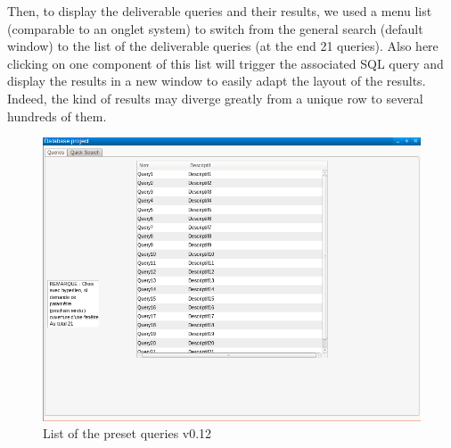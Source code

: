 \documentclass{article}
\begin{document}
Then, to display the deliverable queries and their results, we used a menu list (comparable to an onglet system) to switch from the general search (default window) to the list of the deliverable queries (at the end 21 queries). Also here clicking on one component of this list will trigger the associated SQL query and display the results in a new window to easily adapt the layout of the results. Indeed, the kind of results may diverge greatly from a unique row to several hundreds of them.
\begin{figure}[H]
        \includegraphics[width=\linewidth]{preset_list.png}
        \captionsetup{justification=centering}
        \caption{List of the preset queries v0.12}
    \end{figure}
    
\end{document}
